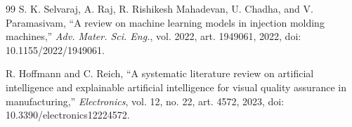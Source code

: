 \documentclass[11pt,a4paper]{article}
\begin{document}
\begin{thebibliography}{99}
 S. K. Selvaraj, A. Raj, R. Rishikesh Mahadevan, U. Chadha, and V. Paramasivam, ``A review on machine learning models in injection molding machines,'' \emph{Adv. Mater. Sci. Eng.}, vol. 2022, art. 1949061, 2022, doi: 10.1155/2022/1949061.

 R. Hoffmann and C. Reich, ``A systematic literature review on artificial intelligence and explainable artificial intelligence for visual quality assurance in manufacturing,'' \emph{Electronics}, vol. 12, no. 22, art. 4572, 2023, doi: 10.3390/electronics12224572.

\end{thebibliography}
\end{document}
